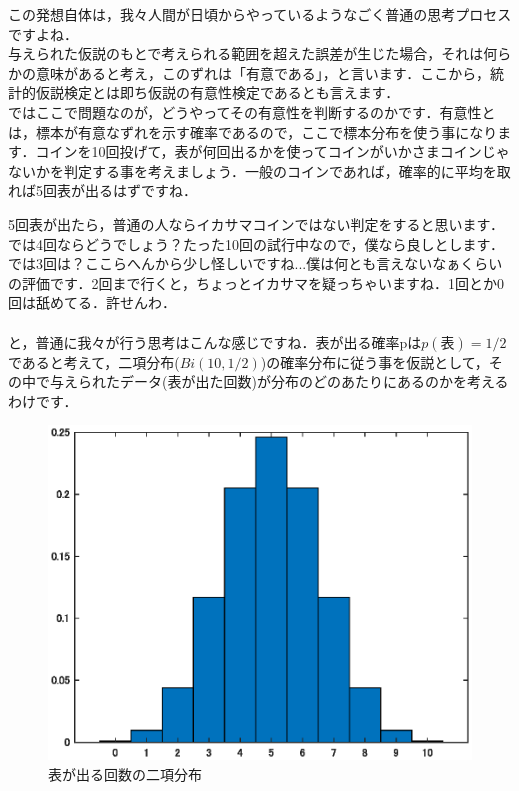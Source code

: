 \documentclass[11pt,a4paper,uplatex]{ujreport} 	%
\begin{document}
この発想自体は，我々人間が日頃からやっているようなごく普通の思考プロセスですよね．\\

与えられた仮説のもとで考えられる範囲を超えた誤差が生じた場合，それは何らかの意味があると考え，このずれは「有意である」，と言います．ここから，統計的仮説検定とは即ち仮説の有意性検定であるとも言えます．\\

ではここで問題なのが，どうやってその有意性を判断するのかです．有意性とは，標本が有意なずれを示す確率であるので，ここで標本分布を使う事になります．コインを10回投げて，表が何回出るかを使ってコインがいかさまコインじゃないかを判定する事を考えましょう．一般のコインであれば，確率的に平均を取れば5回表が出るはずですね．

5回表が出たら，普通の人ならイカサマコインではない判定をすると思います．では4回ならどうでしょう？たった10回の試行中なので，僕なら良しとします．では3回は？ここらへんから少し怪しいですね...僕は何とも言えないなぁくらいの評価です．2回まで行くと，ちょっとイカサマを疑っちゃいますね．1回とか0回は舐めてる．許せんわ．\\\\

と，普通に我々が行う思考はこんな感じですね．表が出る確率pは$p(表)=1/2$であると考えて，二項分布($Bi(10,1/2)$)の確率分布に従う事を仮説として，その中で与えられたデータ(表が出た回数)が分布のどのあたりにあるのかを考えるわけです．

\begin{figure}[H]
  \label{im:bino}
    \centering
    \includegraphics[width=120mm]{../figures/bino.eps}
    \caption{表が出る回数の二項分布}
\end{figure}
\end{document}
